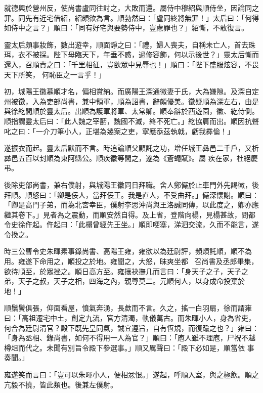 \begin{pinyinscope}
 就德興於營州反，使尚書盧同往討之，大敗而還。屬侍中穆紹與順侍坐，因論同之罪。同先有近宅借紹，紹頗欲為言。順勃然曰：「盧同終將無罪！」太后曰：「何得如侍中之言？」順曰：「同有好宅與要勢侍中，豈慮罪也？」紹慚，不敢復言。



 靈太后頗事妝飾，數出遊幸，順面諍之曰：「禮，婦人喪夫，自稱未亡人，首去珠珥，衣不被採。陛下母臨天下，年垂不惑，過修容飾，何以示後世？」靈太后慚而還入，召順責之曰：「千里相征，豈欲眾中見辱也！」順曰：「陛下盛服炫容，不畏天下所笑，
 何恥臣之一言乎！」



 初，城陽王徽慕順才名，偏相賞納。而廣陽王深通徽妻于氏，大為嫌隙。及深自定州被徵，入為吏部尚書，兼中領軍，順為詔書，辭頗優美。徽疑順為深左右，由是與徐紇間順於靈太后。出順為護軍將軍、太常卿。順奉辭於西遊園，徽、紇侍側。順指謂靈太后曰：「此人魏之宰嚭，魏國不滅，終不死亡。」紇協肩而出。順因抗聲叱之曰：「一介刀筆小人，正堪為幾案之吏，寧應忝茲執戟，虧我彞倫！」



 遂振衣而起。靈太后默而不言。時追論順父顧託之功，增任城王彝邑二千戶，又析彞邑五百以封順為東阿縣公。順疾徽等間之，遂為《蒼蠅賦》。屬
 疾在家，杜絕慶弔。



 後除吏部尚書，兼右僕射，與城陽王徽同日拜職。舍人鄭儼於止車門外先謁徽，後拜順。順怒曰：「卿是佞人，當拜佞王。我是直人，不受曲拜。」儼深懷謝。順曰：「卿是高門子弟，而為北宮幸臣，僕射李思沖尚與王洛誠同傳，以此度之，卿亦應繼其卷下。」見者為之震動，而順安然自得。及上省，登階向榻，見榻甚故，問都令史徐仵起。仵起曰：「此榻曾經先王坐。」順即哽塞，涕泗交流，久而不能言，遂令換之。



 時三公曹令史朱暉素事錄尚書、高陽王雍，雍欲以為廷尉評，頻煩託順，順不為用。雍遂下命用之，順投之於地。雍聞之，大怒，昧爽坐都
 ，召尚書及丞郎畢集，欲待順至，於眾挫之。順日高方至。雍攘袂撫几而言曰：「身天子之子，天子之弟，天子之叔，天子之相，四海之內，親尊莫二。元順何人，以身成命投棄於地！」



 順鬚鬢俱張，仰面看屋，憤氣奔湧，長歔而不言。久之，搖一白羽扇，徐而謂雍曰：「高祖遷宅中土，創定九流，官方清濁，軌儀萬古。而朱暉小人，身為省吏，何合為廷尉清官？殿下既先皇同氣，誠宜遵旨，自有恆規，而復踰之也？」雍曰：「身為丞相、錄尚書，如何不得用一人為官？」順曰：「庖人雖不理庖，尸祝不越樽俎而代之。未聞有別旨令殿下參選事。」順又厲聲曰：「殿下必如是，順當依
 事奏聞。」



 雍遂笑而言曰：「豈可以朱暉小人，便相忿恨。」遂起，呼順入室，與之極飲。順之亢毅不撓，皆此類也。後兼左僕射。




\end{pinyinscope}
